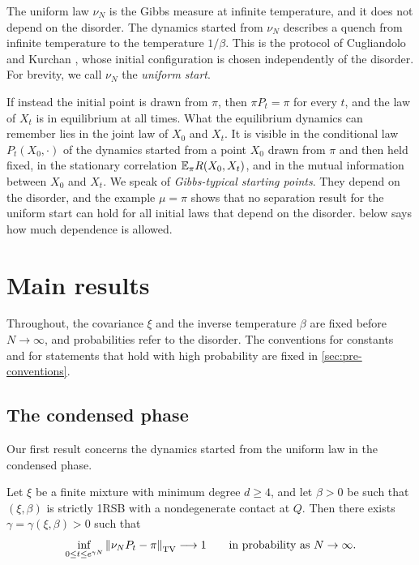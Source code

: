 The uniform law $\nu_N$ is the Gibbs measure at infinite temperature, and it does not depend on the disorder. The dynamics started from $\nu_N$ describes a quench from infinite temperature to the temperature $1/\beta$. This is the protocol of Cugliandolo and Kurchan \cite{CugliandoloKurchan1993}, whose initial configuration is chosen independently of the disorder. For brevity, we call $\nu_N$ the \emph{uniform start}.

If instead the initial point is drawn from $\pi$, then $\pi P_t=\pi$ for every $t$, and the law of $X_t$ is in equilibrium at all times. What the equilibrium dynamics can remember lies in the joint law of $X_0$ and $X_t$. It is visible in the conditional law $P_t(X_0,\cdot)$ of the dynamics started from a point $X_0$ drawn from $\pi$ and then held fixed, in the stationary correlation $\mathbb E_\pi R(X_0,X_t)$, and in the mutual information between $X_0$ and $X_t$. We speak of \emph{Gibbs-typical starting points}. They depend on the disorder, and the example $\mu=\pi$ shows that no separation result for the uniform start can hold for all initial laws that depend on the disorder.  below says how much dependence is allowed.

\section{Main results}\label{sec:intro-results}

Throughout, the covariance $\xi$ and the inverse temperature $\beta$ are fixed before $N\to\infty$, and probabilities refer to the disorder. The conventions for constants and for statements that hold with high probability are fixed in \cref{sec:pre-conventions}.

\subsection{The condensed phase}\label{sec:intro-condensed}

Our first result concerns the dynamics started from the uniform law in the condensed phase.

\begin{theorem}\label{thm:main-condensed}
Let $\xi$ be a finite mixture with minimum degree $d\ge4$, and let $\beta>0$ be such that $(\xi,\beta)$ is strictly 1RSB with a nondegenerate contact at $Q$. Then there exists $\gamma=\gamma(\xi,\beta)>0$ such that
\begin{equation}\label{eq:intro-main}
\inf_{0\le t\le e^{\gamma N}}\left\lVert\nu_NP_t-\pi\right\rVert_{\mathrm{TV}}\longrightarrow1\qquad\text{in probability as }N\to\infty.
\end{equation}
\end{theorem}

